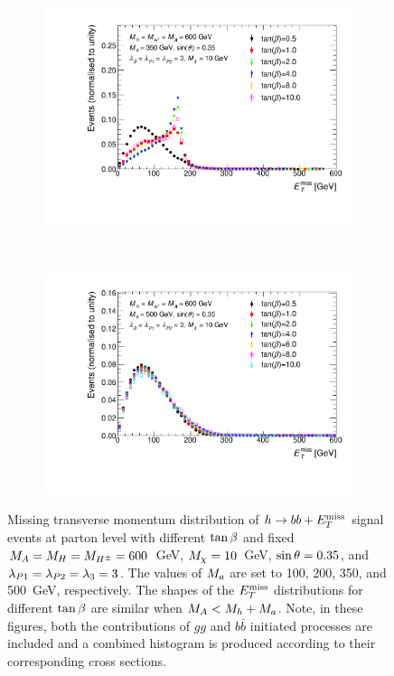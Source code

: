 \begin{figure}[tbp]
\begin{subfigure}{0.48\textwidth}
\includegraphics[width = \textwidth]{texinputs/04_grid/figures/monoHbb_tanb_scan_MA600_Ma350_MET_liny_norm2one.pdf}
\end{subfigure}
~
\begin{subfigure}{0.48\textwidth}
\includegraphics[width = \textwidth]{texinputs/04_grid/figures/monoHbb_tanb_scan_MA600_Ma500_MET_liny_norm2one.pdf}
\end{subfigure}
\caption[$\MET$ distribution in $h\rightarrow bb + \MET$ events for different 
$\tanb$ for $\mA = \mH = \mHc = 600 $ GeV]
{
Missing transverse momentum distribution of $h\rightarrow bb + \MET$ signal 
events at parton level with different $\tanb$ and
 fixed $\mA = \mH = \mHc = 600 $~GeV, $ M_{\chi} = 10$~GeV, $\sin\theta = 0.35$, 
and $ \lambda_{P1} = \lambda_{P2} = \lambda_{3} = 3 $. The values of $M_{a}$ are set to 100, 200, 
350, and 500~GeV, respectively.
The shapes of the $\MET$ distributions for different $\tanb$ are similar when 
$M_{A} < M_{h}+M_{a}$. Note, in these figures, both the contributions of $gg$ and $b\bar{b}$ 
initiated processes are included and a combined histogram is produced 
according to their corresponding cross sections.
}
\label{fig:monoHbb_tanb_scan_met}
\end{figure}

